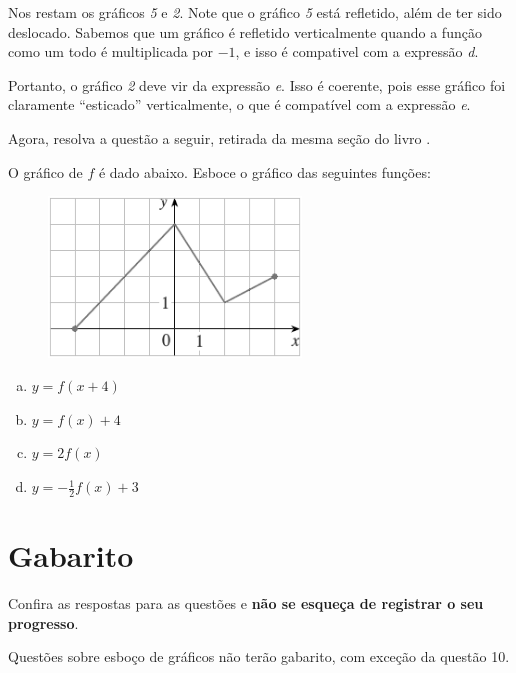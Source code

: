 \documentclass[main.tex]{subfiles}
\begin{document}
Nos restam os gráficos \textit{5} e \textit{2}. Note que o gráfico \textit{5} está refletido, além de ter sido deslocado. Sabemos que um gráfico é refletido verticalmente quando a função como um todo é multiplicada por $-1$, e isso é compativel com a expressão \textit{d}.

Portanto, o gráfico \textit{2} deve vir da expressão \textit{e}. Isso é coerente, pois esse gráfico foi claramente ``esticado'' verticalmente, o que é compatível com a expressão \textit{e}.

Agora, resolva a questão a seguir, retirada da mesma seção do livro .

\begin{resolva}
O gráfico de $f$ é dado abaixo. Esboce o gráfico das seguintes funções:

\begin{figure}[h]
\centering
\includegraphics[width=0.6\textwidth]{./img/c7r2.png}
\end{figure}

\begin{enumerate}[a)]
\item $y=f(x+4)$
\item $y=f(x)+4$
\item $y=2f(x)$
\item $y= -\frac{1}{2}f(x)+3$
\end{enumerate}
\end{resolva}

\section{Gabarito}

Confira as respostas para as questões e \textbf{não se esqueça de registrar o seu progresso}.

Questões sobre esboço de gráficos não terão gabarito, com exceção da questão 10.

\imprimeGabarito

\paraAlunos
\end{document}
